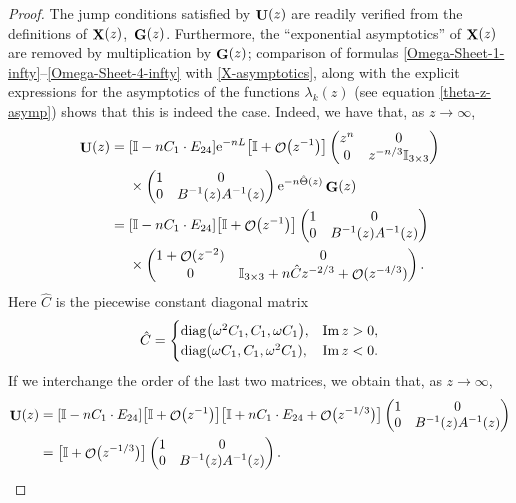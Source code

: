 \documentclass[10pt,a4paper]{amsart}
\DeclareMathOperator{\OO}{\mathcal{O}}
\DeclareMathOperator{\XX}{{\bf X}}
\DeclareMathOperator{\UU}{{\bf U}}
\DeclareMathOperator{\GG}{{\bf G}}
\numberwithin{equation}{section}
\begin{document}
\begin{proof}
The jump conditions satisfied by $\UU(z)$ are readily verified from the definitions of $\XX(z)$,~$\GG(z)$. Furthermore, the ``exponential asymptotics'' of $\XX(z)$
are removed by multiplication by $\GG(z)$;
comparison of formulas \eqref{Omega-Sheet-1-infty}--\eqref{Omega-Sheet-4-infty} with \eqref{X-asymptotics}, along with the explicit expressions for the asymptotics of the functions $\lambda_k(z)$ (see equation \eqref{theta-z-asymp}) shows that this is indeed the case. Indeed, we have that, as $z\to \infty$,
 \begin{align*}
 \UU(z)={}& [\mathbb{I} -nC_1 \cdot E_{24}] {\rm e}^{-n L}\bigl[\mathbb{I} + \OO\bigl(z^{-1}\bigr)\bigr]\begin{pmatrix}
 z^{n} & 0\\
 0 & z^{-n/3}\mathbb{I}_{3\times 3}
 \end{pmatrix}\\
 &\times
 \begin{pmatrix}
 1 & 0\\
 0 & B^{-1}(z) A^{-1}(z)
 \end{pmatrix}{\rm e}^{-n\hat{\Theta}(z)} \GG(z)\\
={}&[\mathbb{I} -n C_1 \cdot E_{24}]\bigl[\mathbb{I} + \OO\bigl(z^{-1}\bigr)\bigr]
 \begin{pmatrix}
 1 & 0\\
 0 & B^{-1}(z) A^{-1}(z)
 \end{pmatrix}\\
 &\times
 \begin{pmatrix}
 1 + \OO(z^{-2}) & 0 \\
 0 & \mathbb{I}_{3\times 3} + n\hat{C}z^{-2/3} + \OO(z^{-4/3})
 \end{pmatrix}.
 \end{align*}
Here $\hat{C}$ is the piecewise constant diagonal matrix
 \begin{equation*}
 \hat{C} =
 \begin{cases}
 {\rm diag}\bigl(\omega^2 C_1, C_1,\omega C_1\bigr), & \operatorname{Im} z > 0,\\
 {\rm diag}(\omega C_1, C_1,\omega^2 C_1), & \operatorname{Im} z < 0.
 \end{cases}
 \end{equation*}
If we interchange the order of the last two matrices, we obtain that, as $z\to \infty$,
 \begin{align*}
 \UU(z) &= [\mathbb{I} -n C_1\cdot E_{24}] \bigl[\mathbb{I} + \OO\bigl(z^{-1}\bigr)\bigr] \bigl[\mathbb{I} + n C_1 \cdot E_{24} + \OO\bigl(z^{-1/3}\bigr)\bigr]
 \begin{pmatrix}
 1 & 0\\
 0 & B^{-1}(z) A^{-1}(z)
 \end{pmatrix}\\
 &= \bigl[\mathbb{I} + \OO\bigl(z^{-1/3}\bigr) \bigr]
 \begin{pmatrix}
 1 & 0\\
 0 & B^{-1}(z) A^{-1}(z)
 \end{pmatrix}.
 \end{align*}


\end{proof}
\end{document}

